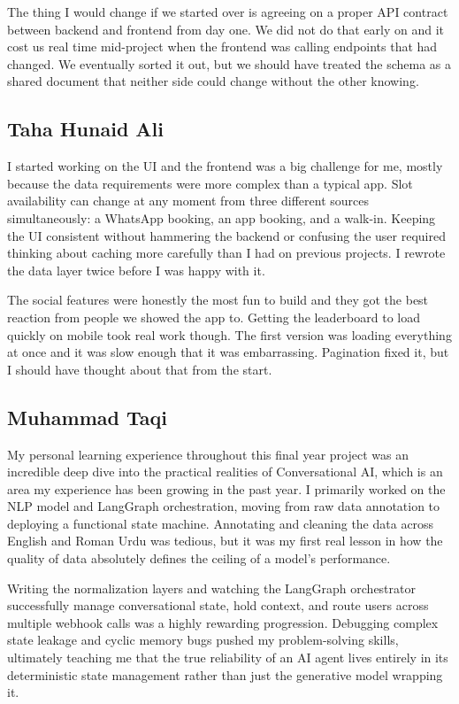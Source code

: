 The thing I would change if we started over is agreeing on a proper API contract between backend and frontend from day one. We did not do that early on and it cost us real time mid-project when the frontend was calling endpoints that had changed. We eventually sorted it out, but we should have treated the schema as a shared document that neither side could change without the other knowing.

\subsection{Taha Hunaid Ali}

I started working on the UI and the frontend was a big challenge for me, mostly because the data requirements were more complex than a typical app. Slot availability can change at any moment from three different sources simultaneously: a WhatsApp booking, an app booking, and a walk-in. Keeping the UI consistent without hammering the backend or confusing the user required thinking about caching more carefully than I had on previous projects. I rewrote the data layer twice before I was happy with it.

The social features were honestly the most fun to build and they got the best reaction from people we showed the app to. Getting the leaderboard to load quickly on mobile took real work though. The first version was loading everything at once and it was slow enough that it was embarrassing. Pagination fixed it, but I should have thought about that from the start.

\subsection{Muhammad Taqi}

My personal learning experience throughout this final year project was an incredible deep dive into the practical realities of Conversational AI, which is an area my experience has been growing in the past year. I primarily worked on the NLP model and LangGraph orchestration, moving from raw data annotation to deploying a functional state machine. Annotating and cleaning the data across English and Roman Urdu was tedious, but it was my first real lesson in how the quality of data absolutely defines the ceiling of a model's performance.

Writing the normalization layers and watching the LangGraph orchestrator successfully manage conversational state, hold context, and route users across multiple webhook calls was a highly rewarding progression. Debugging complex state leakage and cyclic memory bugs pushed my problem-solving skills, ultimately teaching me that the true reliability of an AI agent lives entirely in its deterministic state management rather than just the generative model wrapping it.

